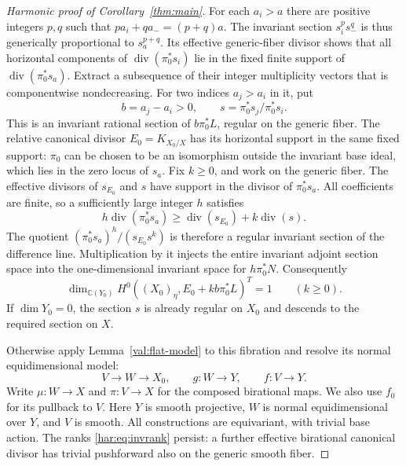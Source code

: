 \begin{proof}[Harmonic proof of Corollary~\ref{thm:main}]
For each \(a_i>a\) there are positive integers \(p,q\) such that
\(pa_i+qa_-=(p+q)a\). The invariant section
\(s_i^p s_-^q\) is thus generically proportional to \(s_a^{p+q}\).
Its effective generic-fiber divisor shows that all horizontal
components of \(\operatorname{div}(\pi_0^*s_i)\) lie in the fixed finite
support of \(\operatorname{div}(\pi_0^*s_a)\). Extract a subsequence of
their integer multiplicity vectors that is componentwise nondecreasing.
For two indices \(a_j>a_i\) in it, put
\[
 b=a_j-a_i>0,\qquad s=\pi_0^*s_j/\pi_0^*s_i.
\]
This is an invariant rational section of \(b\pi_0^*L\), regular on the
generic fiber. The relative canonical divisor
\(E_0=K_{X_0/X}\) has its horizontal support in the same fixed support:
\(\pi_0\) can be chosen to be an isomorphism outside the invariant base
ideal, which lies in the zero locus of \(s_a\). Fix \(k\ge0\), and work on the generic fiber.  The effective
divisors of \(s_{E_0}\) and \(s\) have support in the divisor of
\(\pi_0^*s_a\).  All coefficients are finite, so a sufficiently large
integer \(h\) satisfies
\[
 h\operatorname{div}(\pi_0^*s_a)
 \ge \operatorname{div}(s_{E_0})+k\operatorname{div}(s).
\]
The quotient \((\pi_0^*s_a)^h/(s_{E_0}s^k)\) is therefore a
regular invariant section of the difference line.  Multiplication
by it injects the entire invariant adjoint section space into the
one-dimensional invariant space for \(h\pi_0^*N\).  Consequently
\begin{equation}\label{har:eq:invrank}
 \dim_{\mathbb C(Y_0)}H^0((X_0)_\eta,E_0+kb\pi_0^*L)^T=1
 \qquad(k\ge0).
\end{equation}
If \(\dim Y_0=0\), the section \(s\) is already regular on \(X_0\)
and descends to the required section on \(X\).

Otherwise apply Lemma~\ref{val:flat-model} to this fibration and resolve
its normal equidimensional model:
\[
 V\longrightarrow W\longrightarrow X_0,\qquad g:W\to Y,
 \qquad f:V\to Y.
\]
Write \(\mu:W\to X\) and \(\pi:V\to X\) for the composed birational maps. We also use \(f_0\) for its pullback to \(V\). Here \(Y\) is smooth projective, \(W\) is normal equidimensional over
\(Y\), and \(V\) is smooth. All constructions are equivariant, with
trivial base action. The ranks
\eqref{har:eq:invrank} persist: a further effective birational canonical
divisor has trivial pushforward also on the generic smooth fiber.


\end{proof}
